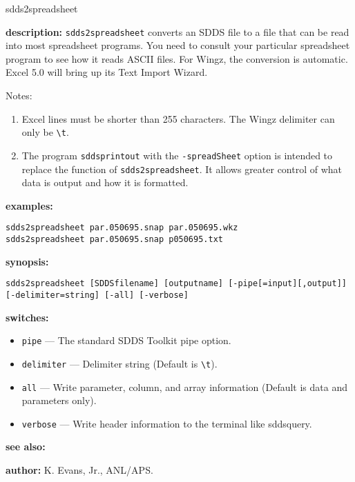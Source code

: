 \begin{sddsprog}{sdds2spreadsheet}
\item \textbf{description:} \verb|sdds2spreadsheet| converts an SDDS file to a file that can be read into most spreadsheet programs. You need to consult your particular spreadsheet program to see how it reads ASCII files. For Wingz, the conversion is automatic. Excel 5.0 will bring up its Text Import Wizard.

  Notes:
  \begin{enumerate}
    \item Excel lines must be shorter than 255 characters. The Wingz delimiter can only be \verb|\t|.
    \item The program \verb|sddsprintout| with the \verb|-spreadSheet| option is intended to replace the function of \verb|sdds2spreadsheet|. It allows greater control of what data is output and how it is formatted.
  \end{enumerate}

\item \textbf{examples:}
  \begin{verbatim}
sdds2spreadsheet par.050695.snap par.050695.wkz
sdds2spreadsheet par.050695.snap p050695.txt
  \end{verbatim}

\item \textbf{synopsis:}
  \begin{verbatim}
sdds2spreadsheet [SDDSfilename] [outputname] [-pipe[=input][,output]] [-delimiter=string] [-all] [-verbose]
  \end{verbatim}

\item \textbf{switches:}
  \begin{itemize}
    \item \verb|pipe| --- The standard SDDS Toolkit pipe option.
    \item \verb|delimiter| --- Delimiter string (Default is \verb|\t|).
    \item \verb|all| --- Write parameter, column, and array information (Default is data and parameters only).
    \item \verb|verbose| --- Write header information to the terminal like sddsquery.
  \end{itemize}

\item \textbf{see also:} 

\item \textbf{author:} K. Evans, Jr., ANL/APS.
\end{sddsprog}

